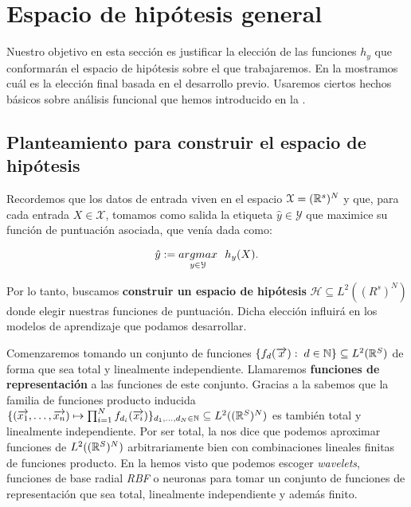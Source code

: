 \section{Espacio de hipótesis general}

Nuestro objetivo en esta sección es justificar la elección de las funciones $h_y$ que conformarán el espacio de hipótesis sobre el que trabajaremos. En la  mostramos cuál es la elección final basada en el desarrollo previo. Usaremos ciertos hechos básicos sobre análisis funcional que hemos introducido en la .

\subsection{Planteamiento para construir el espacio de hipótesis} \label{sec:justificacion_func_repr}

Recordemos que los datos de entrada viven en el espacio $\mathcal{X} = (\mathbb{R}^s)^N$ y que, para cada entrada $X \in \mathcal{X}$, tomamos como salida la etiqueta $\hat{y} \in \mathcal{Y}$ que maximice su función de puntuación asociada, que venía dada como:

\begin{equation}
	\hat{y} := \underset{y \in \mathcal{Y}}{argmax} \ \  h_y(X).
\end{equation}

Por lo tanto, buscamos \textbf{construir un espacio de hipótesis} $\mathcal{H} \subseteq L^2((R^s)^N)$ donde elegir nuestras funciones de puntuación. Dicha elección influirá en los modelos de aprendizaje que podamos desarrollar.

Comenzaremos tomando un conjunto de funciones $\{ f_d(\overrightarrow{x}): \; d \in \mathbb{N} \} \subseteq L^2(\mathbb{R}^S)$ de forma que sea total y linealmente independiente. Llamaremos \textbf{funciones de representación} a las funciones de este conjunto. Gracias a la  sabemos que la familia de funciones producto inducida $\{ (\overrightarrow{x_1}, \ldots, \overrightarrow{x_n}) \mapsto \prod_{i = 1}^N f_{d_i}(\overrightarrow{x_i})  \}_{d_1, \ldots, d_N \in \mathbb{N}} \subseteq L^2((\mathbb{R}^S)^N)$ es también total y linealmente independiente. Por ser total, la  nos dice que podemos aproximar funciones de $L^2((\mathbb{R}^S)^N)$ arbitrariamente bien con combinaciones lineales finitas de funciones producto. En la  hemos visto que podemos escoger \textit{wavelets}, funciones de base radial \textit{RBF} o neuronas para tomar un conjunto de funciones de representación que sea total, linealmente independiente y además finito.

